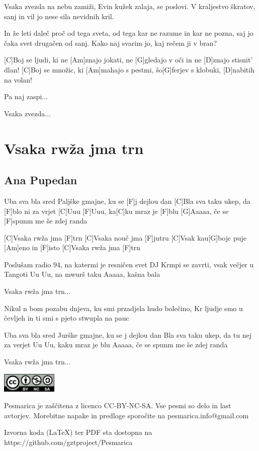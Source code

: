 \documentclass[a4paper,12pt]{article}
\begin{document}
\begin{multicols}{2}
\begin{guitar}
Vsaka zvezda na nebu zamiži, 
Evin kužek zalaja, se poslovi. 
V kraljestvo škratov, sanj in vil 
jo nese sila nevidnih  kril. 


In že leti daleč proč od tega sveta, 
od tega kar ne razume in kar ne pozna, 
saj jo čaka svet drugačen od sanj. 
Kako naj svarim jo, kaj rečem ji v bran? 


[C]Boj se ljudi, ki ne [Am]znajo jokati, 
ne [G]gledajo v oči in ne [D]znajo stisnit’ dlan! 
[C]Boj se množic, ki [Am]mahajo s pestmi, 
šo[G]ferjev s klobuki, [D]nabitih na volan! 


Pa naj zaspi... 


Vsaka zvezda...

\end{guitar}
\section{Vsaka rwža jma trn}
\subsection*{Ana Pupedan}
\begin{guitar}
[C]Uba sva bla sred Paljške gmajne, 
ku se [F]j dejlou dan
[C]Bla sva taku ukep, da [F]blo ni za vrjet
[C]Uuu [F]Uuu, ka[C]ku mraz je [F]blu
[G]Aaaaa, če se [F]spunm me še zdej randa


[C]Vsaka rwža jma [F]trn
[C]Vsaka nouč jma [F]jutru
[C]Vsak kau[G]bojc puje [Am]eno in [F]isto
[C]Vsaka rwža jma [F]trn


Poslušam radio 94, na katermi je resničen svet
DJ Krmpi se zavrti, vsak večjer u Tangoti
Uu Uu, na mwurš taku
Aaaaa, kašna bala


Vsaka rwža jma trn...


Nikul n bom pozabu dnjeva, 
ku smi przadjela hudo bolečino,
Kr ljudje smo u čevljeh 
in ti smi s pjeto stwupla na pauc


Uba sva bla sred Jurške gmajne, 
ku se j dejlou dan
Bla sva taku ukep, da tu nej za verjet
Uu Uu, kaku mraz je blu
Aaaaa, če se spunm me še zdej randa


Vsaka rwža jma trn...

\end{guitar}
\end{multicols}
\clearpage
\clearpage
\null
\vfill
\center
\includegraphics[width=100px]{img/licence.png}

Pesmarica je zaščitena z licenco CC-BY-NC-SA. Vse pesmi so delo in last avtorjev. Morebitne napake in predloge sporočite na pesmarica.info@gmail.com 

Izvorna koda (LaTeX) ter PDF sta dostopna na https://github.com/gztproject/Pesmarica
\end{document}
